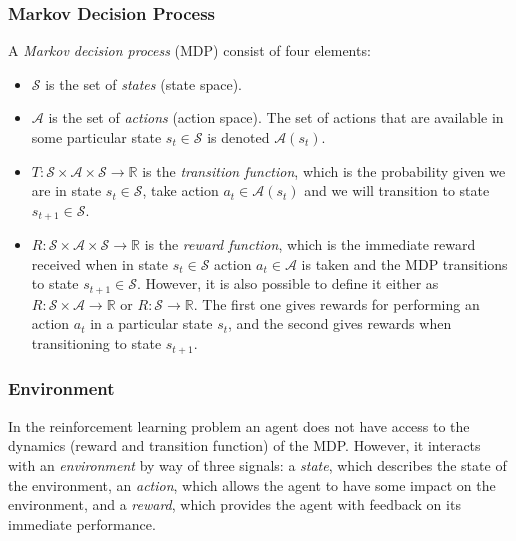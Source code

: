 \documentclass{article}
\begin{document}
\subsubsection{Markov Decision Process}

A \emph{Markov decision process} (MDP) consist of four elements:

\begin{itemize}

    \item $\mathcal{S}$ is the set of \emph{states} (state space).

    \item $\mathcal{A}$ is the set of \emph{actions} (action space). The set of actions that are
        available in some particular state $s_t \in \mathcal{S}$ is denoted $\mathcal{A}(s_t)$.

    \item $ T : \mathcal{S} \times \mathcal{A} \times \mathcal{S} \to \mathbb{R}$ is the
      \emph{transition function}, which is the probability given we are in state $s_t \in
      \mathcal{S}$, take action $a_t \in \mathcal{A}(s_t)$ and we will transition to state $s_{t+1}
      \in \mathcal{S}$.

    \item $ R : \mathcal{S} \times \mathcal{A} \times \mathcal{S} \to \mathbb{R}$ is the
      \emph{reward function}, which is the immediate reward received when in state $s_t \in
      \mathcal{S}$ action $a_t \in \mathcal{A}$ is taken and the MDP transitions to state $s_{t+1}
      \in \mathcal{S}$. However, it is also possible to define it either as $ R : \mathcal{S} \times
      \mathcal{A} \to \mathbb{R}$ or $R : \mathcal{S} \to \mathbb{R}$. The first one gives rewards
      for performing an action $a_t$ in a particular state $s_t$, and the second gives rewards when
      transitioning to state $s_{t+1}$.

\end{itemize}

\subsubsection{Environment}

In the reinforcement learning problem an agent does not have access to the dynamics (reward and
transition function) of the MDP. However, it interacts with an \emph{environment} by way of three
signals: a \emph{state}, which describes the state of the environment, an \emph{action}, which
allows the agent to have some impact on the environment, and a \emph{reward}, which provides the
agent with feedback on its immediate performance.
\end{document}
